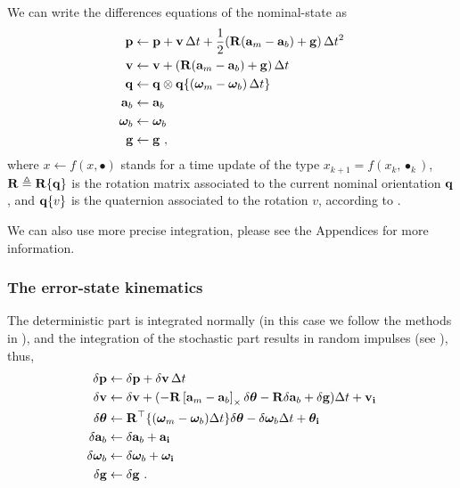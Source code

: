 We can write the differences equations of the nominal-state as
%
\begin{subequations}
%
\begin{align}
{\bf p} &\gets {\bf p} + {\bf v}\, \Delta t + \frac{1}{2}({\bf R}({\bf a}_{m}-{\bf a}_{b})+{\bf g})\, \Delta t ^2\\
{\bf v} &\gets {\bf v} + ({\bf R}({\bf a}_{m}-{\bf a}_{b})+{\bf g})\, \Delta t \\
{\bf q} &\gets {\bf q}\otimes {\bf q}\{({\bm \omega}_{m} - {\bm \omega}_{b})\, \Delta t\} \\
{\bf a}_{b} &\gets {\bf a}_{b} \\
{\bm \omega}_{b} &\gets {\bm \omega}_{b} \\
{\bf g} &\gets {\bf g}~,
\end{align}%
\end{subequations}%
%
where $x\gets f(x,\bullet)$ stands for a time update of the type $x_{k+1} = f(x_k,\bullet_k)$, ${\bf R}\triangleq{\bf R}\{{\bf q}\}$ is the rotation matrix associated to the current nominal orientation ${\bf q}$, and ${\bf q}\{v\}$ is the quaternion associated to the rotation $v$, according to .

We can also use more precise integration, please see the Appendices for more information.



\subsubsection{The error-state kinematics}


The deterministic part is integrated normally (in this case we follow the methods in ), and the integration of the stochastic part results in random impulses (see ), thus,
%
\begin{subequations}
%
\begin{align}
\delta{\bf p} &\gets \delta{\bf p} + \delta{\bf v}\,\Delta t \\
\delta{\bf v} &\gets \delta{\bf v} + (-{\bf R}\left[{\bf a}_{m}-{\bf a}_{b}\right]_\times\delta{\bm \theta} - {\bf R}\delta{\bf a}_{b} + \delta{\bf g})\Delta t + {\bf v}_{\bf i} \\
\delta{\bm \theta} &\gets {\bf R}^{\top}\{({\bm \omega}_{m}-{\bm \omega}_{b})\Delta t\}\delta{\bm \theta} - \delta{\bm \omega}_{b} \Delta t + {\bm \theta}_{\bf i} \\
\delta{\bf a}_{b} &\gets \delta{\bf a}_{b} + {\bf a}_{\bf i} \\
\delta{\bm \omega}_{b} &\gets \delta{\bm \omega}_{b} + {\bm \omega}_{\bf i} \\
\delta{\bf g} &\gets \delta{\bf g} ~.
\end{align}%
\end{subequations}

